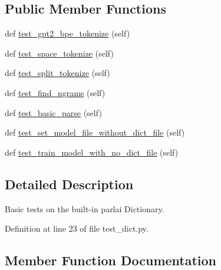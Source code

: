 \subsection*{Public Member Functions}
\begin{DoxyCompactItemize}
\item 
def \hyperlink{classtests_1_1test__dict_1_1TestDictionary_a9109b6c1bf1f0e7adfdd3fc4dc1ead74}{test\+\_\+gpt2\+\_\+bpe\+\_\+tokenize} (self)
\item 
def \hyperlink{classtests_1_1test__dict_1_1TestDictionary_aa586d6cf97a48027ee00ed74234acb11}{test\+\_\+space\+\_\+tokenize} (self)
\item 
def \hyperlink{classtests_1_1test__dict_1_1TestDictionary_aa10a7901ffa04a2d0ba43b43b0a18f26}{test\+\_\+split\+\_\+tokenize} (self)
\item 
def \hyperlink{classtests_1_1test__dict_1_1TestDictionary_ae017e72c578005310906979e15c51fe4}{test\+\_\+find\+\_\+ngrams} (self)
\item 
def \hyperlink{classtests_1_1test__dict_1_1TestDictionary_a864b582dad32c539b4499f521c9afb3f}{test\+\_\+basic\+\_\+parse} (self)
\item 
def \hyperlink{classtests_1_1test__dict_1_1TestDictionary_a6c7dcec12a72ba52852f7b214d4783bf}{test\+\_\+set\+\_\+model\+\_\+file\+\_\+without\+\_\+dict\+\_\+file} (self)
\item 
def \hyperlink{classtests_1_1test__dict_1_1TestDictionary_a33993874a2fa2dc57b3936479b17aae1}{test\+\_\+train\+\_\+model\+\_\+with\+\_\+no\+\_\+dict\+\_\+file} (self)
\end{DoxyCompactItemize}


\subsection{Detailed Description}
\begin{DoxyVerb}Basic tests on the built-in parlai Dictionary.
\end{DoxyVerb}
 

Definition at line 23 of file test\+\_\+dict.\+py.



\subsection{Member Function Documentation}
\mbox{\label{classtests_1_1test__dict_1_1TestDictionary_a864b582dad32c539b4499f521c9afb3f}} 
